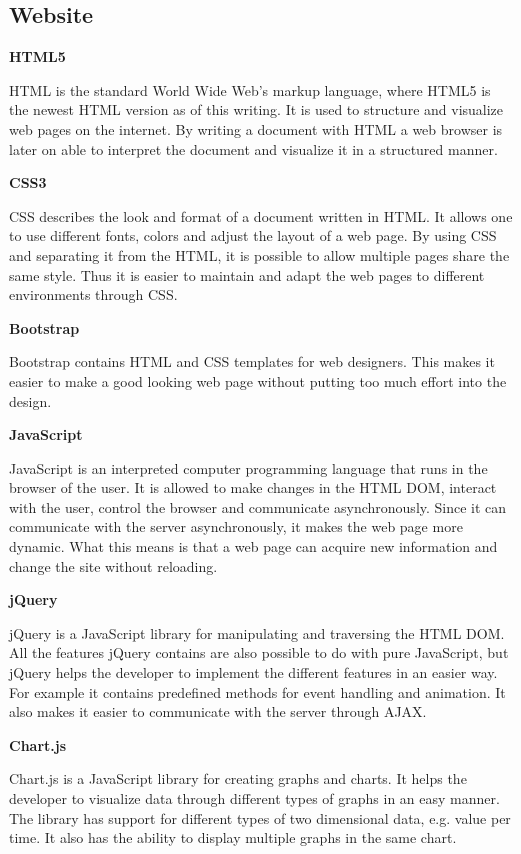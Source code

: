 \subsection{Website}

\textbf{HTML5} \nocite{HTML5}

HTML is the standard World Wide Web's markup language, where HTML5 is the newest HTML version as of this writing.
It is used to structure and visualize web pages on the internet.
By writing a document with HTML a web browser is later on able to interpret the document and visualize it in a structured manner.

\textbf{CSS3} \nocite{CSS3}

CSS describes the look and format of a document written in HTML.
It allows one to use different fonts, colors and adjust the layout of a web page.
By using CSS and separating it from the HTML, it is possible to allow multiple pages share the same style.
Thus it is easier to maintain and adapt the web pages to different environments through CSS.

\textbf{Bootstrap} \nocite{Bootstrap}

Bootstrap contains HTML and CSS templates for web designers.
This makes it easier to make a good looking web page without putting too much effort into the design.

\textbf{JavaScript} \nocite{JavaScript}

JavaScript is an interpreted computer programming language that runs in the browser of the user.
It is allowed to make changes in the HTML DOM, interact with the user, control the browser and communicate asynchronously.
Since it can communicate with the server asynchronously, it makes the web page more dynamic.
What this means is that a web page can acquire new information and change the site without reloading.

\textbf{jQuery} \nocite{jQuery}

jQuery is a JavaScript library for manipulating and traversing the HTML DOM.
All the features jQuery contains are also possible to do with pure JavaScript, but jQuery helps the developer to implement the different features in an easier way.
For example it contains predefined methods for event handling and animation.
It also makes it easier to communicate with the server through AJAX.

\textbf{Chart.js} \nocite{Chartjs}

Chart.js is a JavaScript library for creating graphs and charts.
It helps the developer to visualize data through different types of graphs in an easy manner.
The library has support for different types of two dimensional data, e.g. value per time.
It also has the ability to display multiple graphs in the same chart.

